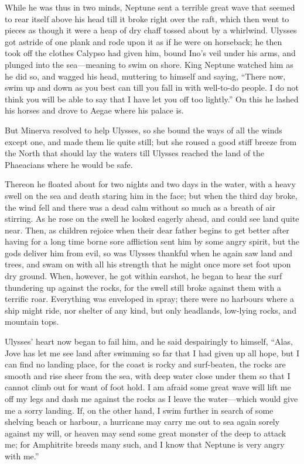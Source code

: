 While he was thus in two minds, Neptune sent a terrible great wave that seemed
to rear itself above his head till it broke right over the raft, which then
went to pieces as though it were a heap of dry chaff tossed about by a
whirlwind. Ulysses got astride of one plank and rode upon it as if he were on
horseback; he then took off the clothes Calypso had given him, bound Ino’s veil
under his arms, and plunged into the sea—meaning to swim on shore. King Neptune
watched him as he did so, and wagged his head, muttering to himself and saying,
“There now, swim up and down as you best can till you fall in with well-to-do
people. I do not think you will be able to say that I have let you off too
lightly.” On this he lashed his horses and drove to Aegae where his palace is.

But Minerva resolved to help Ulysses, so she bound the ways of all the winds
except one, and made them lie quite still; but she roused a good stiff breeze
from the North that should lay the waters till Ulysses reached the land of the
Phaeacians where he would be safe.

Thereon he floated about for two nights and two days in the water, with a heavy
swell on the sea and death staring him in the face; but when the third day
broke, the wind fell and there was a dead calm without so much as a breath of
air stirring. As he rose on the swell he looked eagerly ahead, and could see
land quite near. Then, as children rejoice when their dear father begins to get
better after having for a long time borne sore affliction sent him by some
angry spirit, but the gods deliver him from evil, so was Ulysses thankful when
he again saw land and trees, and swam on with all his strength that he might
once more set foot upon dry ground. When, however, he got within earshot, he
began to hear the surf thundering up against the rocks, for the swell still
broke against them with a terrific roar. Everything was enveloped in spray;
there were no harbours where a ship might ride, nor shelter of any kind, but
only headlands, low-lying rocks, and mountain tops.

Ulysses’ heart now began to fail him, and he said despairingly to himself,
“Alas, Jove has let me see land after swimming so far that I had given up all
hope, but I can find no landing place, for the coast is rocky and surf-beaten,
the rocks are smooth and rise sheer from the sea, with deep water close under
them so that I cannot climb out for want of foot hold. I am afraid some great
wave will lift me off my legs and dash me against the rocks as I leave the
water—which would give me a sorry landing. If, on the other hand, I swim
further in search of some shelving beach or harbour, a hurricane may carry me
out to sea again sorely against my will, or heaven may send some great monster
of the deep to attack me; for Amphitrite breeds many such, and I know that
Neptune is very angry with me.”

